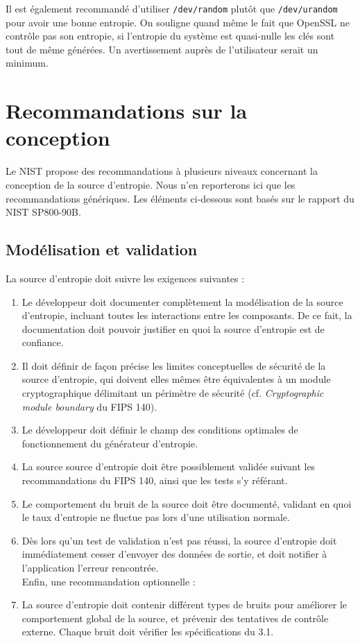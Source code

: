 			Il est également recommandé d'utiliser \texttt{/dev/random} plutôt que
			\texttt{/dev/urandom} pour avoir une bonne entropie. On souligne quand même le fait que OpenSSL ne contrôle pas
			son entropie, si l'entropie du système est quasi-nulle les
			clés sont tout de même générées. Un avertissement auprès de
			l'utilisateur serait un minimum.
			
\section{Recommandations sur la conception}
Le NIST propose des recommandations à plusieurs niveaux concernant la conception de la source d'entropie. Nous n'en reporterons ici que les recommandations génériques. Les éléments ci-dessous sont basés sur le rapport du NIST SP800-90B.

\subsection{Modélisation et validation}
La source d'entropie doit suivre les exigences suivantes :
\begin{enumerate}
\item Le développeur doit documenter complètement la modélisation de la source d'entropie, incluant toutes les interactions entre les composants. De ce fait, la documentation doit pouvoir justifier en quoi la source d'entropie est de confiance. 
\item Il doit définir de façon précise les limites conceptuelles de sécurité de la source d'entropie, qui doivent elles mêmes être équivalentes à un module cryptographique délimitant un périmètre de sécurité (cf. \textit{Cryptographic module boundary} du FIPS 140).
\item Le développeur doit définir le champ des conditions optimales de fonctionnement du générateur d'entropie.
\item La source source d'entropie doit être possiblement validée suivant les recommandations du FIPS 140, ainsi que les tests s'y référant.
\item Le comportement du bruit de la source doit être documenté, validant en quoi le taux d'entropie ne fluctue pas lors d'une utilisation normale.
\item Dès lors qu'un test de validation n'est pas réussi, la source d'entropie doit immédiatement cesser d'envoyer des données de sortie, et doit notifier à l'application l'erreur rencontrée.\\

Enfin, une recommandation optionnelle : 
\item La source d'entropie doit contenir différent types de bruits pour améliorer le comportement global de la source, et prévenir des tentatives de contrôle externe. Chaque bruit doit vérifier les spécifications du 3.1. 
\end{enumerate}

